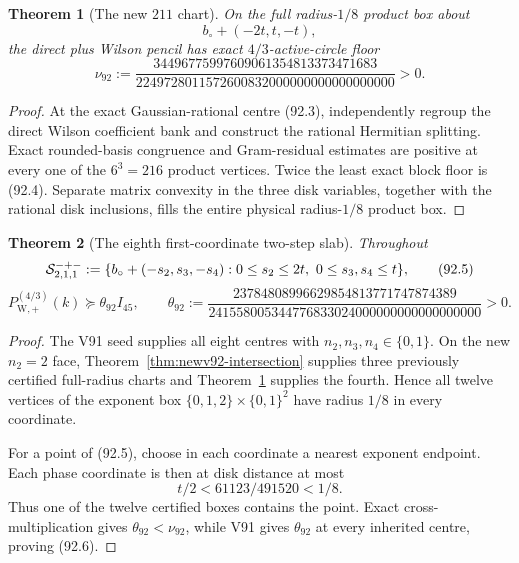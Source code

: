 \documentclass[11pt,oneside]{article}
\newtheorem{theorem}{Theorem}[section]
\theoremstyle{definition}
\theoremstyle{remark}
\begin{document}
\begin{theorem}[The new \(211\) chart]
\label{thm:newv92-new-chart}
On the full radius-\(1/8\) product box about
\[
 b_\circ+(-2t,t,-t),                                 \tag{92.3}
\]
the direct plus Wilson pencil has exact \(4/3\)-active-circle floor
\[
\nu_{92}:=
\frac{34496775997609061354813373471683}
     {2249728011572600832000000000000000000}>0.       \tag{92.4}
\]
\end{theorem}

\begin{proof}
At the exact Gaussian-rational centre (92.3), independently regroup
the direct Wilson coefficient bank and construct the rational
Hermitian splitting.  Exact rounded-basis congruence and
Gram-residual estimates are positive at every one of the
\(6^3=216\) product vertices.  Twice the least exact block floor is
(92.4).  Separate matrix convexity in the three disk variables,
together with the rational disk inclusions, fills the entire
physical radius-\(1/8\) product box.
\end{proof}

\begin{theorem}[The eighth first-coordinate two-step slab]
\label{thm:newv92-two-step-slab}
Throughout
\[
 {\cal S}^{-+-}_{2,1,1}:=
 \{b_\circ+(-s_2,s_3,-s_4):
 0\leq s_2\leq2t,\ 0\leq s_3,s_4\leq t\},            \tag{92.5}
\]
\[
 P_{\mathrm W,+}^{(4/3)}(k)
 \succeq\theta_{92}I_{45},\qquad
 \theta_{92}:=
 \frac{23784808996629854813771747874389}
 {241558005344776833024000000000000000000}>0.         \tag{92.6}
\]
\end{theorem}

\begin{proof}
The V91 seed supplies all eight centres with
\(n_2,n_3,n_4\in\{0,1\}\).  On the new \(n_2=2\) face,
Theorem~\ref{thm:newv92-intersection} supplies three previously
certified full-radius charts and
Theorem~\ref{thm:newv92-new-chart} supplies the fourth.  Hence all
twelve vertices of the exponent box
\(\{0,1,2\}\times\{0,1\}^2\) have radius \(1/8\) in every
coordinate.

For a point of (92.5), choose in each coordinate a nearest exponent
endpoint.  Each phase coordinate is then at disk distance at most
\[
 t/2<61123/491520<1/8.                               \tag{92.7}
\]
Thus one of the twelve certified boxes contains the point.  Exact
cross-multiplication gives \(\theta_{92}<\nu_{92}\), while V91 gives
\(\theta_{92}\) at every inherited centre, proving (92.6).
\end{proof}
\end{document}
